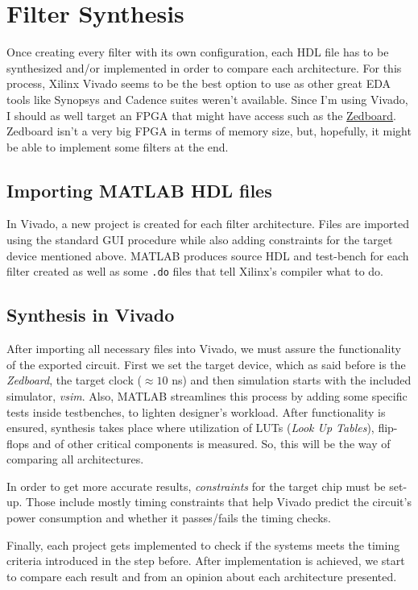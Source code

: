 \section{Filter Synthesis}

Once creating every filter with its own configuration, each HDL file has to be synthesized and/or implemented in order to compare each architecture.
For this process, Xilinx Vivado seems to be the best option to use as other great EDA tools like Synopsys and Cadence suites weren't available. Since I'm using Vivado, I should as well target an FPGA that might have access such as the \href{https://www.xilinx.com/products/boards-and-kits/1-8dyf-11.html}{Zedboard}. Zedboard isn't a very big FPGA in terms of memory size, but, hopefully, it might be able to implement some filters at the end.

\subsection{Importing MATLAB HDL files}
In Vivado, a new project is created for each filter architecture. Files are imported using the standard GUI procedure while also adding constraints for the target device mentioned above.
MATLAB produces source HDL and test-bench for each filter created as well as some \verb|.do| files that tell Xilinx's compiler what to do.

\subsection{Synthesis in Vivado}
After importing all necessary files into Vivado, we must assure the functionality of the exported circuit.
First we set the target device, which as said before is the \textit{Zedboard}, the target clock ($\approx10$ ns) and then simulation starts with the included simulator, \emph{vsim}.
Also, MATLAB streamlines this process by adding some specific tests inside testbenches, to lighten designer's workload.
After functionality is ensured, synthesis takes place where utilization of LUTs (\textit{Look Up Tables}), flip-flops and of other critical components is measured.
So, this will be the way of comparing all architectures.

In order to get more accurate results, \emph{constraints} for the target chip must be set-up. Those include mostly timing constraints that help Vivado predict the circuit's power consumption and whether it passes/fails the timing checks.

Finally, each project gets implemented to check if the systems meets the timing criteria introduced in the step before. After implementation is achieved, we start to compare each result and from an opinion about each architecture presented.